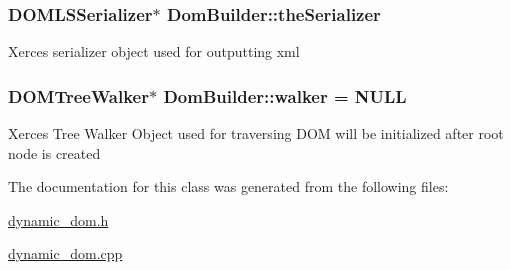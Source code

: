 \subsubsection[{the\+Serializer}]{\setlength{\rightskip}{0pt plus 5cm}D\+O\+M\+L\+S\+Serializer$\ast$ Dom\+Builder\+::the\+Serializer\hspace{0.3cm}{\ttfamily [private]}}\label{class_dom_builder_ad4ffb1b4a9969e681fe3da7aacc7df4a}
Xerces serializer object used for outputting xml \hypertarget{class_dom_builder_ae1ab2463abc4a3f5e86d0a6b6e3f75e8}{}
\subsubsection[{walker}]{\setlength{\rightskip}{0pt plus 5cm}D\+O\+M\+Tree\+Walker$\ast$ Dom\+Builder\+::walker = N\+U\+L\+L\hspace{0.3cm}{\ttfamily [private]}}\label{class_dom_builder_ae1ab2463abc4a3f5e86d0a6b6e3f75e8}
Xerces Tree Walker Object used for traversing D\+O\+M will be initialized after root node is created 

The documentation for this class was generated from the following files\+:\begin{DoxyCompactItemize}
\item 
\hyperlink{dynamic__dom_8h}{dynamic\+\_\+dom.\+h}\item 
\hyperlink{dynamic__dom_8cpp}{dynamic\+\_\+dom.\+cpp}\end{DoxyCompactItemize}
